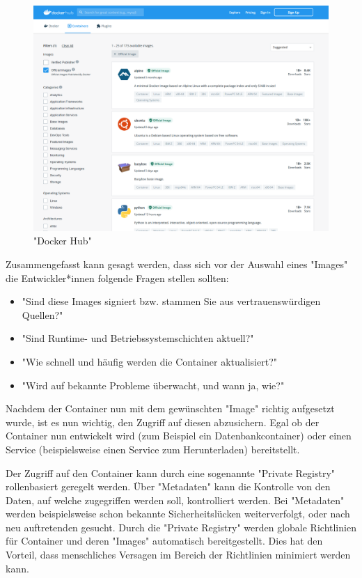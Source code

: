 \begin{figure}[H]
    \centering
    \includegraphics[width=\textwidth]{media/DockerAndContainering/DockerHub.png}
    \caption{"Docker Hub" \cite{DockerHub}}
    \label{fig:dockerhub}
\end{figure}

Zusammengefasst kann gesagt werden, dass sich vor der Auswahl eines "Images" die Entwickler*innen folgende Fragen stellen sollten:

\begin{itemize}
    \item "Sind diese Images signiert bzw. stammen Sie aus vertrauenswürdigen Quellen?" \cite{ContainerSecurity}
    \item "Sind Runtime- und Betriebssystemschichten aktuell?" \cite{ContainerSecurity}
    \item "Wie schnell und häufig werden die Container aktualisiert?" \cite{ContainerSecurity}
    \item "Wird auf bekannte Probleme überwacht, und wann ja, wie?" \cite{ContainerSecurity}
\end{itemize}


Nachdem der Container nun mit dem gewünschten "Image" richtig aufgesetzt wurde, ist es nun wichtig, den Zugriff auf diesen abzusichern. Egal ob der Container nun entwickelt wird (zum Beispiel ein Datenbankcontainer) oder einen Service (beispielsweise einen Service zum Herunterladen) bereitstellt. 

Der Zugriff auf den Container kann durch eine sogenannte "Private Registry" rollenbasiert geregelt werden. Über "Metadaten" kann die Kontrolle von den Daten, auf welche zugegriffen werden soll, kontrolliert werden. Bei "Metadaten" werden beispielsweise schon bekannte Sicherheitslücken weiterverfolgt, oder nach neu auftretenden gesucht. Durch die "Private Registry" werden globale Richtlinien für Container und deren "Images" automatisch bereitgestellt. Dies hat den Vorteil, dass menschliches Versagen im Bereich der Richtlinien minimiert werden kann. \cite{ContainerSecurity}

